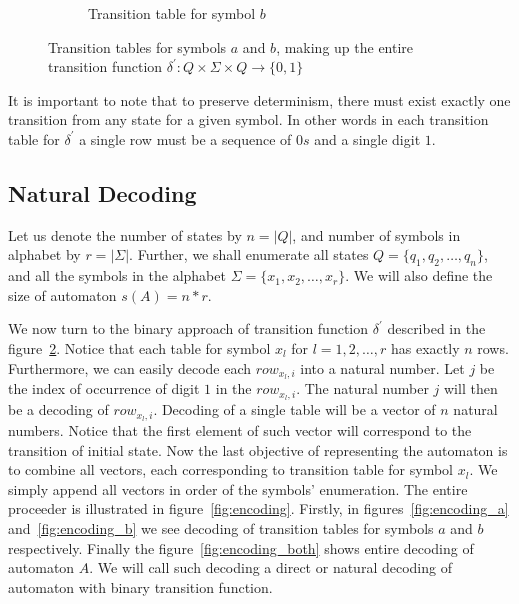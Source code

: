 \documentclass{mini}
\begin{document}
\begin{figure}[H]
\begin{center}
\begin{subfigure}{.5\textwidth}
\begin{tabular}{|P{1.0cm} || P{0.8cm} | P{0.8cm} | P{0.8cm} | P{0.8cm}|}
            \end{tabular}
            
            \caption{Transition table for symbol $b$}
            \label{fig:ttable_bin_b}
            
        \end{subfigure}%
        
        
        \caption{Transition tables for symbols $a$ and $b$, making up the entire transition function $\delta^{'}: Q \times \Sigma \times Q \rightarrow \{0,1\}$}
        
        \label{fig:ttable_bin}
    \end{center}
\end{figure}

It is important to note that to preserve determinism, there must exist exactly one transition from any state for a given symbol. In other words in each transition table for $\delta^{'}$ a single row must be a sequence of $0s$ and a single digit $1$.

\subsection{Natural Decoding} \label{sec:auto_dec}

Let us denote the number of states by $n = |Q|$, and number of symbols in alphabet by $r = |\Sigma|$. Further, we shall enumerate all states 	$Q = \{q_1, q_2, \ldots, q_n\}$, and all the symbols in the alphabet 	$\Sigma = \{x_1, x_2, \ldots, x_r\}$. We will also define the size of automaton $s(A) = n*r$.

We now turn to the binary approach of transition function $\delta^{'}$ described in the figure~\ref{fig:ttable_bin}. Notice that each table for symbol $x_l$ for $l = 1,2, \dots, r$ has exactly $n$ rows. Furthermore, we can easily decode each $row_{x_l, i}$ into a natural number. Let $j$ be the index of occurrence of digit $1$ in the $row_{x_l, i}$. The natural number $j$ will then be a decoding of $row_{x_l, i}$. Decoding of a single table will be a vector of $n$ natural numbers. Notice that the first element of such vector will correspond to the transition of initial state. Now the last objective of representing the automaton is to combine all vectors, each corresponding to transition table for symbol $x_{l}$. We simply append all vectors in order of the symbols' enumeration. The entire proceeder is illustrated in figure~\ref{fig:encoding}. Firstly, in figures~\ref{fig:encoding_a} and~\ref{fig:encoding_b} we see decoding of transition tables for symbols $a$ and $b$ respectively. Finally the figure~\ref{fig:encoding_both} shows entire decoding of automaton $A$. We will call such decoding a direct or natural decoding of automaton with binary transition function.
\end{document}
